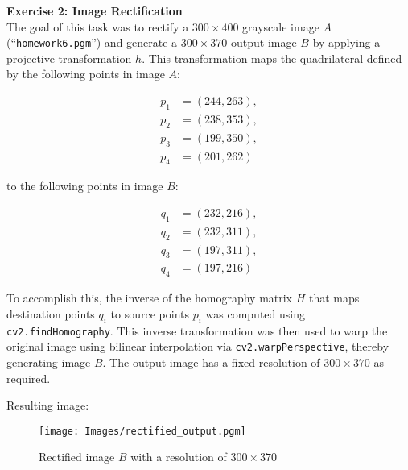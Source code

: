\textbf{Exercise 2: Image Rectification}\\

The goal of this task was to rectify a \(300 \times 400\) grayscale image \(A\) (``\texttt{homework6.pgm}'') and generate a \(300 \times 370\) output image \(B\) by applying a projective transformation \(h\). This transformation maps the quadrilateral defined by the following points in image \(A\):

\[
\begin{aligned}
p_1 &= (244, 263), \\
p_2 &= (238, 353), \\
p_3 &= (199, 350), \\
p_4 &= (201, 262)
\end{aligned}
\]

to the following points in image \(B\):

\[
\begin{aligned}
q_1 &= (232, 216), \\
q_2 &= (232, 311), \\
q_3 &= (197, 311), \\
q_4 &= (197, 216)
\end{aligned}
\]

To accomplish this, the inverse of the homography matrix \(H\) that maps destination points \(q_i\) to source points \(p_i\) was computed using \texttt{cv2.findHomography}. This inverse transformation was then used to warp the original image using bilinear interpolation via \texttt{cv2.warpPerspective}, thereby generating image \(B\). The output image has a fixed resolution of \(300 \times 370\) as required.

Resulting image:
\begin{figure}
    \centering
    \texttt{[image: Images/rectified\_output.pgm]}
    \caption{Rectified image \(B\) with a resolution of \(300 \times 370\)}
\end{figure}
